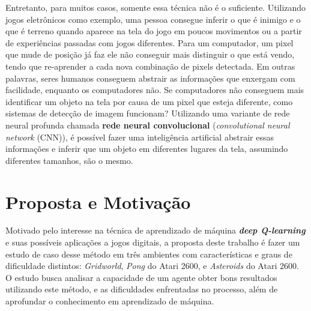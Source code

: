 Entretanto, para muitos casos, somente essa técnica não é o suficiente.
Utilizando jogos eletrônicos como exemplo, uma pessoa consegue inferir o que é inimigo e o que é terreno quando aparece na tela do jogo em poucos movimentos ou a partir de experiências passadas com jogos diferentes.
Para um computador, um pixel que mude de posição já faz ele não conseguir mais distinguir o que está vendo, tendo que re-aprender a cada nova combinação de pixels detectada.
Em outras palavras, seres humanos conseguem abstrair as informações que enxergam com facilidade, enquanto os computadores não.
Se computadores não conseguem mais identificar um objeto na tela por causa de um pixel que esteja diferente, como sistemas de detecção de imagem funcionam?
Utilizando uma variante de rede neural profunda chamada \textbf{rede neural convolucional} (\textit{convolutional neural network} (CNN)), é possível fazer uma inteligência artificial abstrair essas informações e inferir que um objeto em diferentes lugares da tela, assumindo diferentes tamanhos, são o mesmo.

\section{Proposta e Motivação}
\label{sec:motivacao_proposta}

Motivado pelo interesse na técnica de aprendizado de máquina \textbf{\textit{deep Q-learning}} e suas possíveis aplicações a jogos digitais, a proposta deste trabalho é fazer um estudo de caso desse método em três ambientes com características e graus de dificuldade distintos: \textit{Gridworld}, \textit{Pong} do Atari 2600, e \textit{Asteroids} do Atari 2600.
O estudo busca analisar a capacidade de um agente obter bons resultados utilizando este método, e as dificuldades enfrentadas no processo, além de aprofundar o conhecimento em aprendizado de máquina.


